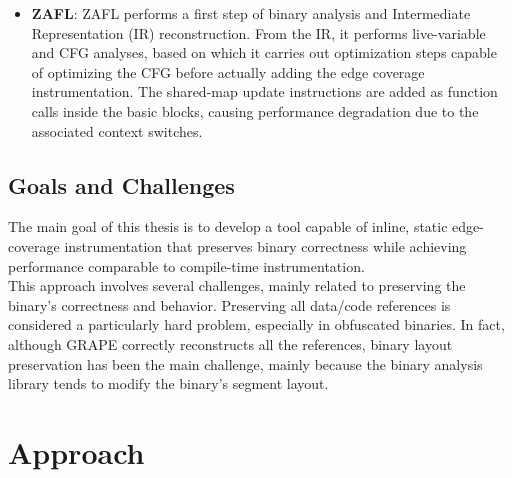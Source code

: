 \documentclass{report}
\begin{document}
\begin{itemize}
                        Moreover, community-reported issues document missing instrumentation points when
                        RetroWrite's symbolized output is compiled through afl-gcc, caused by a mismatch between RetroWrite's
                        label-naming convention and afl-as's basic-block detection heuristics.
                        Finally, RetroWrite only works with PIE, non-stripped binaries.
                    \item \textbf{ZAFL}: ZAFL performs a first step of binary analysis and Intermediate Representation (IR) reconstruction.
                            From the IR, it performs live-variable and CFG analyses, based on which it carries out optimization steps
                            capable of optimizing the CFG before actually adding the edge coverage instrumentation.
                            The shared-map update instructions are added as function calls inside the basic blocks,
                            causing performance degradation due to the associated context switches.
                \end{itemize}

            \section{Goals and Challenges}
                The main goal of this thesis is to develop a tool capable of inline, static edge-coverage instrumentation
                that preserves binary correctness while achieving performance comparable to compile-time instrumentation.\\
                This approach involves several challenges, mainly related to preserving the binary's correctness and behavior.
                Preserving all data/code references is considered a particularly hard problem, especially in obfuscated binaries.
                In fact, although GRAPE correctly reconstructs all the references, binary layout preservation
                has been the main challenge, mainly because the binary analysis library tends to modify the binary's segment layout.


        \chapter{Approach}
\end{document}
